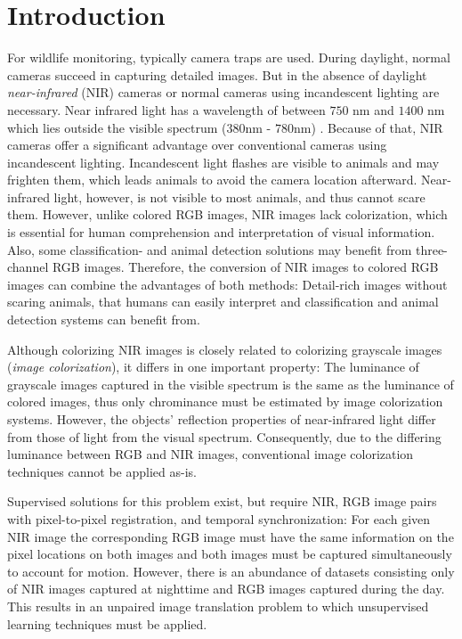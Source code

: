 \chapter{Introduction}
For wildlife monitoring, typically camera traps are used. During daylight, normal cameras succeed in capturing detailed images.
But in the absence of daylight \textit{near-infrared} (NIR) cameras or normal cameras using incandescent lighting are necessary.
Near infrared light has a wavelength of between $750$ nm and $1400$ nm which lies outside the visible spectrum ($380$nm - $780$nm) \parencite{ISO.20473:2007}. 
Because of that, NIR cameras offer a significant advantage over conventional cameras using incandescent lighting.
Incandescent light flashes are visible to animals and may frighten them, which leads animals to avoid the camera location afterward.
Near-infrared light, however, is not visible to most animals, and thus cannot scare them.
However, unlike colored RGB images, NIR images lack colorization, which is essential for human comprehension and interpretation of visual information.
Also, some classification- and animal detection solutions may benefit from three-channel RGB images.
Therefore, the conversion of NIR images to colored RGB images can combine the advantages of both methods:
Detail-rich images without scaring animals, that humans can easily interpret and classification and animal detection systems can benefit from.

Although colorizing NIR images is closely related to colorizing grayscale images (\textit{image colorization}), it differs in one important property:
The luminance of grayscale images captured in the visible spectrum is the same as the luminance of colored images, thus only chrominance must be estimated by image colorization systems.
However, the objects' reflection properties of near-infrared light differ from those of light from the visual spectrum.
Consequently, due to the differing luminance between RGB and NIR images, conventional image colorization techniques cannot be applied as-is.

Supervised solutions for this problem exist, but require NIR, RGB image pairs with pixel-to-pixel registration, and temporal synchronization:
For each given NIR image the corresponding RGB image must have the same information on the pixel locations on both images and both images must be captured simultaneously to account for motion.
However, there is an abundance of datasets consisting only of NIR images captured at nighttime and RGB images captured during the day.
This results in an unpaired image translation problem to which unsupervised learning techniques must be applied.

